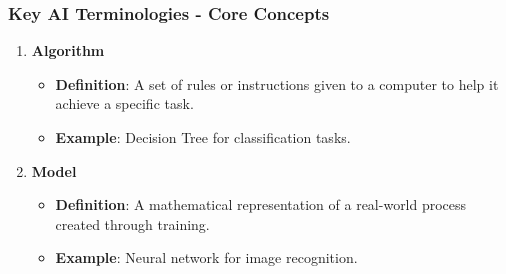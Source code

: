 \documentclass[aspectratio=169]{beamer}
\begin{document}
\begin{frame}[fragile]
    \frametitle{Key AI Terminologies - Core Concepts}
    \begin{enumerate}
        \item \textbf{Algorithm}
        \begin{itemize}
            \item \textbf{Definition}: A set of rules or instructions given to a computer to help it achieve a specific task.
            \item \textbf{Example}: Decision Tree for classification tasks.
        \end{itemize}
        
        \item \textbf{Model}
        \begin{itemize}
            \item \textbf{Definition}: A mathematical representation of a real-world process created through training.
            \item \textbf{Example}: Neural network for image recognition.
        \end{itemize}
    \end{enumerate}
\end{frame}
\end{document}
